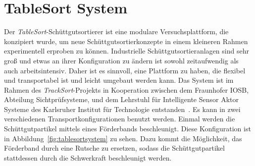 \section{TableSort System}




Der \textit{TableSort}-Schüttgutsortierer ist eine modulare Versuchsplattform, die konzipiert wurde, um neue Schüttgutsortierkonzepte in einem kleineren Rahmen experimentell erproben zu können.
Industrielle Schüttgutsortieranlagen sind sehr groß und etwas an ihrer Konfiguration zu ändern ist sowohl zeitaufwendig als auch arbeitsintensiv.
Daher ist es sinnvoll, eine Plattform zu haben, die flexibel und transportabel ist und leicht umgebaut werden kann.
Das System ist im Rahmen des \textit{TrackSort}-Projekts in Kooperation zwischen dem Fraunhofer IOSB, Abteilung Sichtprüfsysteme, und dem Lehrstuhl für Intelligente Sensor Aktor Systeme des Karlsruher Institut für Technologie entstanden~\cite{doll2015}.
Es kann in zwei verschiedenen Transportkonfigurationen benutzt werden.
Einmal werden die Schüttgutpartikel mittels eines Förderbands beschleunigt.
Diese Konfiguration ist in Abbildung~\ref{fig:tablesortsystem} zu sehen.
Dazu kommt die Möglichkeit, das Förderband durch eine Rutsche zu ersetzen, sodass die Schüttgutpartikel stattdessen durch die Schwerkraft beschleunigt werden. 


